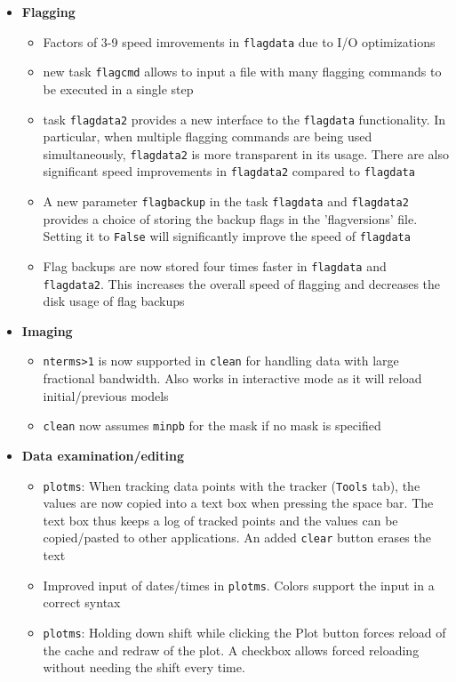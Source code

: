   
\begin{itemize}

\item {\bf  Flagging }
    \begin{itemize} 
     \item Factors of 3-9 speed imrovements in {\tt flagdata} due to I/O optimizations 
     \item new task {\tt flagcmd} allows to input a file with many flagging commands to be executed in a single step
     \item task {\tt flagdata2} provides a new interface to the {\tt flagdata} functionality. In particular, when multiple flagging commands are being used simultaneously, {\tt flagdata2} is more transparent in its usage. There are also significant speed improvements in {\tt flagdata2} compared to {\tt flagdata}
     \item A new parameter {\tt flagbackup} in the task {\tt flagdata} and {\tt flagdata2} provides a choice of storing the backup flags in the 'flagversions' file. Setting it to {\tt False} will significantly improve the speed of {\tt flagdata}
     \item Flag backups are now stored four times faster in {\tt flagdata} and {\tt flagdata2}. This increases the overall speed of flagging and decreases the disk usage of flag backups
   \end{itemize}

\item {\bf  Imaging }
    \begin{itemize}
     \item {\tt nterms>1} is now supported in {\tt clean} for handling data with large fractional bandwidth. Also works in interactive mode as it will reload initial/previous models
     \item {\tt clean} now assumes {\tt minpb} for the mask if no mask is specified

   \end{itemize}

\item {\bf  Data examination/editing }
  \begin{itemize}
    \item {\tt plotms}: When tracking data points with the tracker ({\tt Tools} tab), the values are now copied into a text box when pressing the space bar. The text box thus keeps a log of tracked points and the values can be copied/pasted to other applications. An added {\tt clear} button erases the text
    \item Improved input of dates/times in {\tt plotms}. Colors support the input in a correct syntax
    \item {\tt plotms}: Holding down shift while clicking the Plot button forces reload of the cache and redraw of the plot. A checkbox allows forced reloading without needing the shift every time. 
   \end{itemize}


\end{itemize}
